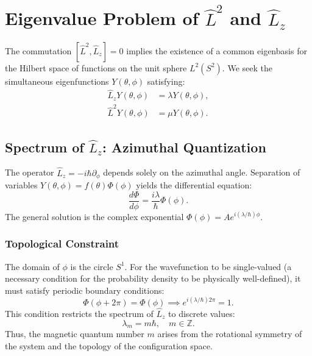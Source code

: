 \section{Eigenvalue Problem of \texorpdfstring{$\hat{L}^2$}{L²} and
\texorpdfstring{$\hat{L}_z$}{L\_z}}

The commutation $[\hat{L}^2, \hat{L}_z] = 0$ implies the existence of a common
eigenbasis for the Hilbert space of functions on the unit sphere $L^2(S^2)$. We
seek the simultaneous eigenfunctions $Y(\theta, \phi)$ satisfying:
\begin{align}
  \hat{L}_z Y(\theta, \phi) &= \lambda Y(\theta, \phi), \\
  \hat{L}^2 Y(\theta, \phi) &= \mu Y(\theta, \phi).
\end{align}

\subsection{Spectrum of \texorpdfstring{$\hat{L}_z$}{L\_z}: Azimuthal Quantization}

The operator $\hat{L}_z = -i\hbar \partial_\phi$ depends solely on the azimuthal
angle. Separation of variables $Y(\theta, \phi) = f(\theta)\Phi(\phi)$ yields
the differential equation:
\begin{equation}
  \frac{d\Phi}{d\phi} = \frac{i\lambda}{\hbar} \Phi(\phi).
\end{equation}
The general solution is the complex exponential $\Phi(\phi) = A
e^{i(\lambda/\hbar)\phi}$.

\subsubsection{Topological Constraint}
The domain of $\phi$ is the circle $S^1$. For the wavefunction to be
single-valued (a necessary condition for the probability density to be
physically well-defined), it must satisfy periodic boundary conditions:
\begin{equation}
  \Phi(\phi + 2\pi) = \Phi(\phi) \implies e^{i(\lambda/\hbar)2\pi} = 1.
\end{equation}
This condition restricts the spectrum of $\hat{L}_z$ to discrete values:
\begin{equation}
  \lambda_m = m\hbar, \quad m \in \mathbb{Z}.
\end{equation}
Thus, the magnetic quantum number $m$ arises from the rotational symmetry of the
system and the topology of the configuration space.


